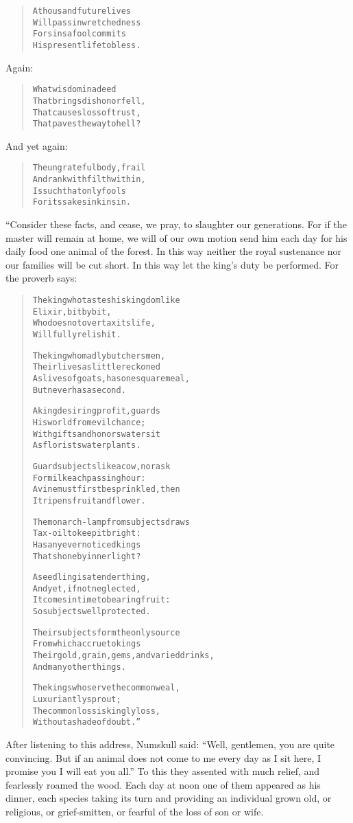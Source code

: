 \documentclass[article, twoside, 14pt]{memoir}
\renewenvironment{verbatim}{%
\begin{quote}%
\vskip -10pt%
\begin{alltt}\normalfont\large}{\end{alltt}%
\end{quote}%
\vskip -10pt
} %
\begin{document}
\begin{verbatim}
A thousand future lives
    Will pass in wretchedness
For sins a fool commits
    His present life to bless.
\end{verbatim}
Again:

\begin{verbatim}
What wisdom in a deed
    That brings dishonor fell,
That causes loss of trust,
    That paves the way to hell?
\end{verbatim}
And yet again:

\begin{verbatim}
The ungrateful body, frail
    And rank with filth within,
Is such that only fools
    For its sake sink in sin.
\end{verbatim}
“Consider these facts, and cease, we pray, to slaughter our
generations. For if the master will remain at home, we will of our
own motion send him each day for his daily food one animal of the
forest. In this way neither the royal sustenance nor our families
will be cut short. In this way let the king's duty be performed.
For the proverb says:

\begin{verbatim}
The king who tastes his kingdom like
    Elixir, bit by bit,
Who does not overtax its life,
Will fully relish it.

The king who madly butchers men,
    Their lives as little reckoned
As lives of goats, has one square meal,
    But never has a second.

A king desiring profit, guards
    His world from evil chance;
With gifts and honors waters it
    As florists water plants.

Guard subjects like a cow, nor ask
    For milk each passing hour:
A vine must first be sprinkled, then
    It ripens fruit and flower.

The monarch-lamp from subjects draws
    Tax-oil to keep it bright:
Has any ever noticed kings
    That shone by inner light?

A seedling is a tender thing,
    And yet, if not neglected,
It comes in time to bearing fruit:
    So subjects well protected.

Their subjects form the only source
    From which accrue to kings
Their gold, grain, gems, and varied drinks,
    And many other things.

The kings who serve the common weal,
    Luxuriantly sprout;
The common loss is kingly loss,
    Without a shade of doubt.”
\end{verbatim}
After listening to this address, Numskull said:
``Well, gentlemen, you are quite convincing. But if an animal does not come to me every day as I sit here, I promise you I will eat you all.''
To this they assented with much relief, and fearlessly roamed the
wood. Each day at noon one of them appeared as his dinner, each
species taking its turn and providing an individual grown old, or
religious, or grief-smitten, or fearful of the loss of son or
wife.
\end{document}
